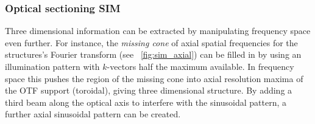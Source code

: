 \subsubsection{Optical sectioning \gls{SIM}}

Three dimensional information can be extracted by manipulating frequency space even further.
For instance, the \emph{\gls{missing cone}} of axial spatial frequencies for the structures's Fourier transform (see \figurename~\ref{fig:sim_axial}) can be filled in by using an illumination pattern with $k$-vectors half the maximum available.
In frequency space this pushes the region of the missing cone into axial resolution maxima of the \gls{OTF} support (toroidal), giving three dimensional structure.
By adding a third beam along the optical axis to interfere with the sinusoidal pattern, a further axial sinusoidal pattern can be created.

